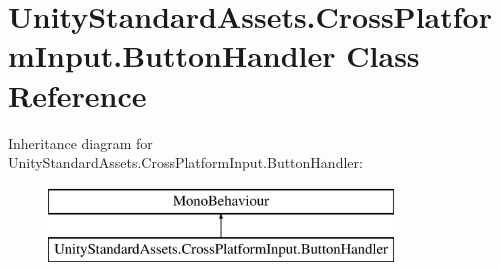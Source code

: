 \hypertarget{class_unity_standard_assets_1_1_cross_platform_input_1_1_button_handler}{}\section{Unity\+Standard\+Assets.\+Cross\+Platform\+Input.\+Button\+Handler Class Reference}
\label{class_unity_standard_assets_1_1_cross_platform_input_1_1_button_handler}
Inheritance diagram for Unity\+Standard\+Assets.\+Cross\+Platform\+Input.\+Button\+Handler\+:\begin{figure}[H]
\begin{center}
\leavevmode
\includegraphics[height=2.000000cm]{class_unity_standard_assets_1_1_cross_platform_input_1_1_button_handler}
\end{center}
\end{figure}
